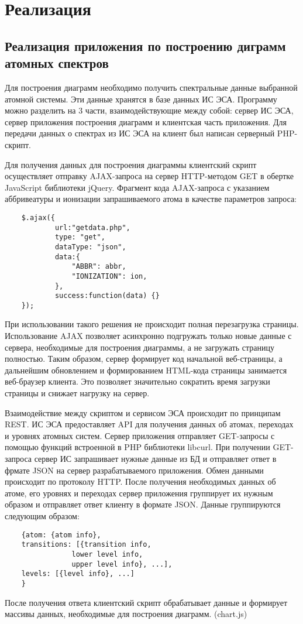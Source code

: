 \documentclass[a4paper, 12pt]{article}
\let\stdsection\section
\renewcommand\section{\newpage\stdsection}
\begin{document}
\section{Реализация}
  \subsection{Реализация приложения по построению диграмм атомных спектров}
  Для построения диаграмм необходимо получить спектральные данные выбранной атомной системы. Эти данные хранятся в базе данных ИС ЭСА. Программу можно разделить на 3 части, взаимодействующие между собой: сервер ИС ЭСА, сервер приложения построения диаграмм и клиентская часть приложения. Для передачи данных о спектрах из ИС ЭСА на клиент был написан серверный PHP-скрипт.\par
  Для получения данных для построения диаграммы клиентский скрипт осуществляет отправку AJAX-запроса на сервер HTTP-методом GET в обертке JavaScript библиотеки jQuery. Фрагмент кода AJAX-запроса с указанием аббривеатуры и ионизации запрашиваемого атома в качестве параметров запроса:
    \begin{lstlisting}
    $.ajax({
            url:"getdata.php",
            type: "get",
            dataType: "json",
            data:{
                "ABBR": abbr,
                "IONIZATION": ion,
            },
            success:function(data) {} 
    });
    \end{lstlisting}
    При использовании такого решения не происходит полная перезагрузка страницы. Использование AJAX позволяет асинхронно подгружать только новые данные с сервера, необходимые для построения диаграммы, а не загружать страницу полностью. Таким образом, сервер формирует код начальной веб-страницы, а дальнейшим обновлением и формированием HTML-кода страницы занимается веб-браузер клиента. Это позволяет значительно сократить время загрузки страницы и снижает нагрузку на сервер.
  \par
  Взаимодействие между скриптом и сервисом ЭСА происходит по принципам REST. ИС ЭСА предоставляет API для получения данных об атомах, переходах и уровнях атомных систем. Сервер приложения отправляет GET-запросы с помощью функций встроенной в PHP библиотеки libcurl. При получении GET-запроса сервер ИС запрашивает нужные данные из БД и отправляет ответ в фрмате JSON на сервер разрабатываемого приложения. Обмен данными происходит по протоколу HTTP. После получения необходимых данных об атоме, его уровнях и переходах сервер приложения группирует их нужным образом и отправляет ответ клиенту в формате JSON. Данные группируются следующим образом:
  \begin{lstlisting}
    {atom: {atom info}, 
    transitions: [{transition info, 
                lower level info, 
                upper level info}, ...],
    levels: [{level info}, ...]
    }
    \end{lstlisting}
  \par
  После получения ответа клиентский скрипт обрабатывает данные и формирует массивы данных, необходимые для построения диаграмм.
  (chart.js)
\end{document}
